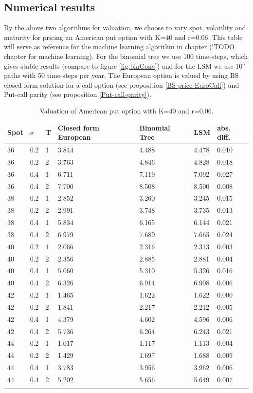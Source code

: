 
\subsection{Numerical results}
By the above two algorithms for valuation, we choose to vary spot, volatility and maturity for pricing an American put option with K=40 and r=0.06. This table will serve as reference for the machine learning algorithm in chapter (!TODO chapter for machine learning). For the binomial tree we use 100 time-steps, which gives stable results (compare to figure \ref{fig:binConv}) and for the LSM we use $10^5$ paths with 50 time-steps per year. The European option is valued by using BS closed form solution for a call option (see proposition \ref{BS-price-EuroCall}) and Put-call parity (see proposition \ref{Put-call-parity}).
\begin{table}[H]
\caption{Valuation of American put option with K=40 and r=0.06.}
\label{tab:treatments}
\centering
\begin{tabular}{l l l l l l l }
\toprule
\textbf{Spot} & \textbf{$\sigma$} & \textbf{T} & \textbf{Closed form European} & \textbf{Binomial Tree} & \textbf{LSM} & \textbf{abs. diff.} \\
\midrule
36 & 0.2 & 1 & 3.844 & 4.488 & 4.478 & 0.010\\
36 & 0.2 & 2 & 3.763 & 4.846 & 4.828 & 0.018\\
36 & 0.4 & 1 & 6.711 & 7.119 & 7.092 & 0.027\\
36 & 0.4 & 2 & 7.700 & 8.508 & 8.500 & 0.008\\
38 & 0.2 & 1 & 2.852 & 3.260 & 3.245 & 0.015\\
38 & 0.2 & 2 & 2.991 & 3.748 & 3.735 & 0.013\\
38 & 0.4 & 1 & 5.834 & 6.165 & 6.144 & 0.021\\
38 & 0.4 & 2 & 6.979 & 7.689 & 7.665 & 0.024\\
40 & 0.2 & 1 & 2.066 & 2.316 & 2.313 & 0.003\\
40 & 0.2 & 2 & 2.356 & 2.885 & 2.881 & 0.004\\
40 & 0.4 & 1 & 5.060 & 5.310 & 5.326 & 0.016\\
40 & 0.4 & 2 & 6.326 & 6.914 & 6.908 & 0.006\\
42 & 0.2 & 1 & 1.465 & 1.622 & 1.622 & 0.000\\
42 & 0.2 & 2 & 1.841 & 2.217 & 2.212 & 0.005\\
42 & 0.4 & 1 & 4.379 & 4.602 & 4.596 & 0.006\\
42 & 0.4 & 2 & 5.736 & 6.264 & 6.243 & 0.021\\
44 & 0.2 & 1 & 1.017 & 1.117 & 1.113 & 0.004\\
44 & 0.2 & 2 & 1.429 & 1.697 & 1.688 & 0.009\\
44 & 0.4 & 1 & 3.783 & 3.956 & 3.962 & 0.006\\
44 & 0.4 & 2 & 5.202 & 5.656 & 5.649 & 0.007\\
\bottomrule\\
\end{tabular}
\end{table}
